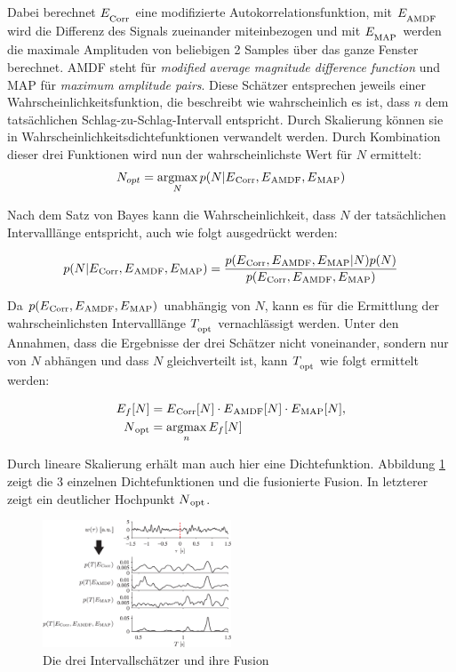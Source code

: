  	Dabei berechnet $E_\textsubscript{Corr}$ eine modifizierte Autokorrelationsfunktion, mit $E_\textsubscript{AMDF}$ wird die Differenz des Signals zueinander miteinbezogen und mit $E_\textsubscript{MAP}$ werden die maximale Amplituden von beliebigen 2 Samples über das ganze Fenster berechnet. AMDF steht für \textit{modified average magnitude difference function} und MAP für \textit{maximum amplitude pairs}. Diese Schätzer entsprechen jeweils einer Wahrscheinlichkeitsfunktion, die beschreibt wie wahrscheinlich es ist, dass $n$ dem tatsächlichen Schlag-zu-Schlag-Intervall entspricht. Durch Skalierung können sie in Wahrscheinlichkeitsdichtefunktionen verwandelt werden. Durch Kombination dieser drei Funktionen wird nun der wahrscheinlichste Wert für $N$ ermittelt:
 	\[ N_{opt} = \operatorname*{argmax}_{N} p(N|E\textsubscript{Corr}, E\textsubscript{AMDF}, E\textsubscript{MAP}) \]
 	
	Nach dem Satz von Bayes kann die Wahrscheinlichkeit, dass $N$ der tatsächlichen Intervalllänge entspricht, auch wie folgt ausgedrückt werden:
	
	\[
		p(N|E\textsubscript{Corr}, E\textsubscript{AMDF}, E\textsubscript{MAP}) = \frac{p(E\textsubscript{Corr}, E\textsubscript{AMDF}, E\textsubscript{MAP} | N) p(N)}{p(E\textsubscript{Corr}, E\textsubscript{AMDF}, E\textsubscript{MAP})}
	\]
	
	Da $p(E\textsubscript{Corr}, E\textsubscript{AMDF}, E\textsubscript{MAP})$ unabhängig von $N$, kann es für die Ermittlung der wahrscheinlichsten Intervalllänge $T_\textsubscript{opt}$ vernachlässigt werden. Unter den Annahmen, dass die Ergebnisse der drei Schätzer nicht voneinander, sondern nur von $N$ abhängen und dass $N$ gleichverteilt ist, kann $T_\textsubscript{opt}$ wie folgt ermittelt werden:
	
	\begin{align*}
		E_f[N] &= E\textsubscript{Corr}[N] \cdot E\textsubscript{AMDF}[N] \cdot E\textsubscript{MAP}[N],\\
		N\textsubscript{opt} &= \operatorname*{argmax}_{n} E_f[N]	
	\end{align*}
	
	Durch lineare Skalierung erhält man auch hier eine Dichtefunktion. Abbildung \ref{fig:estimator-fusion} zeigt die 3 einzelnen Dichtefunktionen und die fusionierte Fusion. In letzterer zeigt ein deutlicher Hochpunkt $N\textsubscript{opt}$.
	
	 \begin{figure}[H]
		\centering
		\includegraphics[width=0.5\textwidth]{pic/estimator-fusion.png}
		\caption[Intervallschätzer nach \citeauthor{Bruser2013}]{Die drei Intervallschätzer und ihre Fusion\protect\footnotemark}
		\label{fig:estimator-fusion}
	\end{figure}
	
